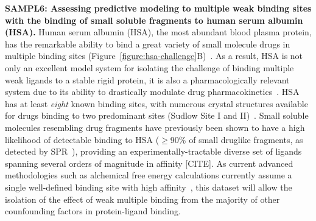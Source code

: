 \documentclass[11pt]{article}
\begin{document}
{\bf SAMPL6: Assessing predictive modeling to multiple weak binding sites with the binding of small soluble fragments to human serum albumin (HSA).}
Human serum albumin (HSA), the most abundant blood plasma protein, has the remarkable ability to bind a great variety of small molecule drugs in multiple binding sites (Figure~\ref{figure:hsa-challenge}B)~\cite{Fasano:2005:IUBMBLife(InternationalUnionofBiochemistryandMolecularBiology:Life)}.
As a result, HSA is not only an excellent model system for isolating the challenge of binding multiple weak ligands to a stable rigid protein, it is also a pharmacologically relevant system due to its ability to drastically modulate drug pharmacokinetics~\cite{Hall:2013:JournalofChemicalInformationandModeling}.
HSA has at least \emph{eight} known binding sites, with numerous crystal structures available for drugs binding to two predominant sites (Sudlow Site I and II)~\cite{Hall:2013:JournalofChemicalInformationandModeling}.
Small soluble molecules resembling drug fragments have previously been shown to have a high likelihood of detectable binding to HSA ($\ge$90\% of small druglike fragments, as detected by SPR~\cite{Elinder:2011:JournalofBiomolecularScreening}), providing an experimentally-tractable diverse set of ligands spanning several orders of magnitude in affinity [CITE].
As current advanced methodologies such as alchemical free energy calculations currently assume a single well-defined binding site with high affinity~\cite{Gilson:1997:BiophysicalJournal}, this dataset will allow the isolation of the effect of weak multiple binding from the majority of other counfounding factors in protein-ligand binding.
\end{document}

